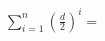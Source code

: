 \documentclass[preview]{standalone}
\begin{document}
\begin{align*}
\sum_{i=1}^n \left(\frac{d}{2}\right)^i=
\end{align*}
\end{document}
